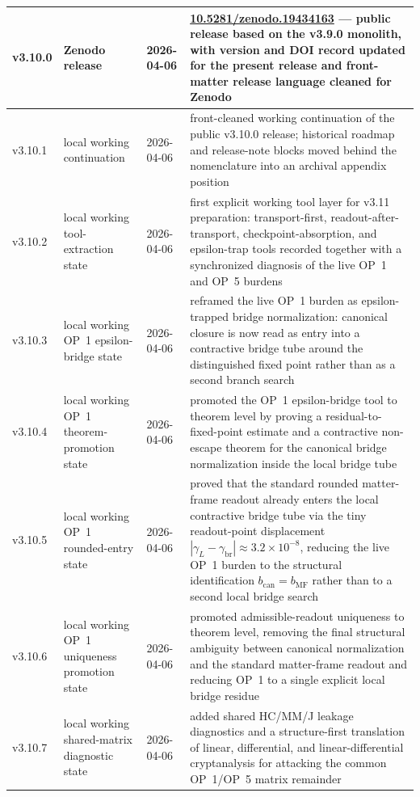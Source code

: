 {\begin{longtable}{|p{}|p{}|p{}|p{}|}
\hline
v3.10.0 & Zenodo release & 2026-04-06 & \href{https://doi.org/10.5281/zenodo.19434163}{10.5281/zenodo.19434163} --- public release based on the v3.9.0 monolith, with version and DOI record updated for the present release and front-matter release language cleaned for Zenodo \\
\hline
v3.10.1 & local working continuation & 2026-04-06 & front-cleaned working continuation of the public v3.10.0 release; historical roadmap and release-note blocks moved behind the nomenclature into an archival appendix position \\
\hline
v3.10.2 & local working tool-extraction state & 2026-04-06 & first explicit working tool layer for v3.11 preparation: transport-first, readout-after-transport, checkpoint-absorption, and epsilon-trap tools recorded together with a synchronized diagnosis of the live OP~1 and OP~5 burdens \\
\hline
v3.10.3 & local working OP~1 epsilon-bridge state & 2026-04-06 & reframed the live OP~1 burden as epsilon-trapped bridge normalization: canonical closure is now read as entry into a contractive bridge tube around the distinguished fixed point rather than as a second branch search \\
\hline
v3.10.4 & local working OP~1 theorem-promotion state & 2026-04-06 & promoted the OP~1 epsilon-bridge tool to theorem level by proving a residual-to-fixed-point estimate and a contractive non-escape theorem for the canonical bridge normalization inside the local bridge tube \\
v3.10.5 & local working OP~1 rounded-entry state & 2026-04-06 & proved that the standard rounded matter-frame readout already enters the local contractive bridge tube via the tiny readout-point displacement $|\gamma_L-\gamma_{\mathrm{br}}|\approx 3.2\times 10^{-8}$, reducing the live OP~1 burden to the structural identification $b_{\mathrm{can}}=b_{\mathrm{MF}}$ rather than to a second local bridge search \\
v3.10.6 & local working OP~1 uniqueness promotion state & 2026-04-06 & promoted admissible-readout uniqueness to theorem level, removing the final structural ambiguity between canonical normalization and the standard matter-frame readout and reducing OP~1 to a single explicit local bridge residue \\
v3.10.7 & local working shared-matrix diagnostic state & 2026-04-06 & added shared HC/MM/J leakage diagnostics and a structure-first translation of linear, differential, and linear-differential cryptanalysis for attacking the common OP~1/OP~5 matrix remainder \\

\end{longtable}}
